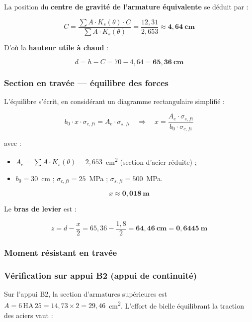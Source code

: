 La position du \textbf{centre de gravité de l'armature équivalente} se déduit par :

\[
C = \frac{\sum A \cdot K_s(\theta) \cdot C}{\sum A \cdot K_s(\theta)} = \frac{12{,}31}{2{,}653} \approx \mathbf{4{,}64~\text{cm}}
\]

D'où la \textbf{hauteur utile à chaud} :

\[
d = h - C = 70 - 4{,}64 = \mathbf{65{,}36~\text{cm}}
\]

\subsubsection{Section en travée — équilibre des forces}

L'équilibre s'écrit, en considérant un diagramme rectangulaire simplifié :

\[
b_0 \cdot x \cdot \sigma_{c,fi} = A_e \cdot \sigma_{s,fi}
\quad\Longrightarrow\quad
x = \frac{A_e \cdot \sigma_{s,fi}}{b_0 \cdot \sigma_{c,fi}}
\]

avec :
\begin{itemize}
  \item $A_e = \sum A \cdot K_s(\theta) = 2{,}653$~cm\textsuperscript{2} (section d'acier réduite) ;
  \item $b_0 = 30$~cm ; $\sigma_{c,fi} = 25$~MPa ; $\sigma_{s,fi} = 500$~MPa.
\end{itemize}

\[
x \approx \mathbf{0{,}018~\text{m}}
\]

Le \textbf{bras de levier} est :

\[
z = d - \frac{x}{2} = 65{,}36 - \frac{1{,}8}{2} = \mathbf{64{,}46~\text{cm} = 0{,}6445~\text{m}}
\]

\subsubsection{Moment résistant en travée}


\subsubsection{Vérification sur appui B2 (appui de continuité)}

Sur l'appui B2, la section d'armatures supérieures est $A = 6 \, \text{HA}\,25 = 14{,}73 \times 2 = 29{,}46$~cm\textsuperscript{2}. L'effort de bielle équilibrant la traction des aciers vaut :

